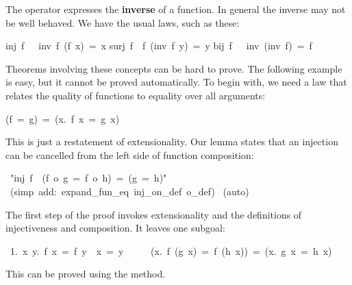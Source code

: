 The operator {} expresses the \textbf{inverse} of a function. In 
general the inverse may not be well behaved.  We have the usual laws,
such as these: 
\begin{isabelle}
inj\ f\ \ \isasymLongrightarrow\ inv\ f\ (f\ x)\ =\ x%
\isanewline
surj\ f\ \isasymLongrightarrow\ f\ (inv\ f\ y)\ =\ y
\isanewline
bij\ f\ \ \isasymLongrightarrow\ inv\ (inv\ f)\ =\ f
\end{isabelle}
%
%

Theorems involving these concepts can be hard to prove. The following 
example is easy, but it cannot be proved automatically. To begin 
with, we need a law that relates the quality of functions to 
equality over all arguments: 
\begin{isabelle}
(f\ =\ g)\ =\ ({\isasymforall}x.\ f\ x\ =\ g\ x)
\end{isabelle}

This is just a restatement of extensionality.  Our lemma states 
that an injection can be cancelled from the left 
side of function composition: 
\begin{isabelle}
\ "inj\ f\ \isasymLongrightarrow\ (f\ o\ g\ =\ f\ o\ h)\ =\ (g\ =\ h)"\isanewline
{}\ (simp\ add:\ expand_fun_eq\ inj_on_def\ o_def)\isanewline
{}\ (auto)\isanewline
{}
\end{isabelle}

The first step of the proof invokes extensionality and the definitions 
of injectiveness and composition. It leaves one subgoal:
\begin{isabelle}
\ 1.\ {\isasymforall}x\ y.\ f\ x\ =\ f\ y\ \isasymlongrightarrow\ x\ =\ y\ \isasymLongrightarrow\isanewline
\ \ \ \ ({\isasymforall}x.\ f\ (g\ x)\ =\ f\ (h\ x))\ =\ ({\isasymforall}x.\ g\ x\ =\ h\ x)
\end{isabelle}
This can be proved using the {} method. 

